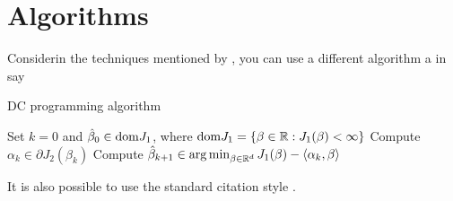 

\section{Algorithms}
\label{sec:algorithms}

Considerin the techniques mentioned by \citet{Jaggi13}, you can use a different algorithm a in say 


\begin{algorithm}
\label{alg:DC}
\caption{DC programming algorithm}
\begin{algorithmic}
\STATE Set $k = 0$ and $\hat{\beta}_0 \in {\rm dom} J_1$, where ${\rm dom} J_1 = \{\beta \in \mathbb{R} : J_1(\beta) < \infty\}$
\REPEAT
\STATE Compute $\alpha_{k} \in \partial J_2(\beta_{k})$
\STATE Compute $\hat{\beta}_{k+1} \in \mathop{\mathrm{arg\,min}}_{\beta \in \mathbb{R}^d} J_1(\beta) - \langle \alpha_k, \beta \rangle$
\end{algorithmic}
\end{algorithm}


It is also possible to use the standard citation style \cite{Tibshirani96}.
